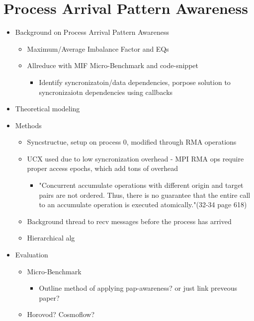 
\glsresetall %
\chapter[PAPAwareness]{Process Arrival Pattern Awareness}\label{ch:PAPAwareness}

\begin{itemize}
    \item Background on Process Arrival Pattern Awareness
    \begin{itemize}
        \item Maximum/Average Imbalance Factor and EQs
        \item Allreduce with MIF Micro-Benchmark and code-snippet
        \begin{itemize}
            \item Identify syncronizatoin/data dependencies, porpose solution to syncronizaiotn dependencies using callbacks \cite{Luo2018ADAPT}
        \end{itemize}
    \end{itemize}
    \item Theoretical modeling
    \item Methods
    \begin{itemize}
        \item Syncstructue, setup on process 0, modified through RMA operations
        \item UCX used due to low syncronization overhead - MPI RMA ops require proper access epochs, which add tons of overhead
        \begin{itemize}
            \item "Concurrent accumulate operations with different origin and target pairs are
not ordered. Thus, there is no guarantee that the entire call to an accumulate operation is
executed atomically."(32-34 page 618)
        \end{itemize}
        \item Background thread to recv messages before the process has arrived 
        \item Hierarchical alg 
    \end{itemize}
    \item Evaluation
    \begin{itemize}
        \item Micro-Benchmark
            \begin{itemize}
                \item Outline method of applying pap-awareness? or just link preveous paper?
            \end{itemize}
        \item Horovod? Cosmoflow?
    \end{itemize}
\end{itemize}

